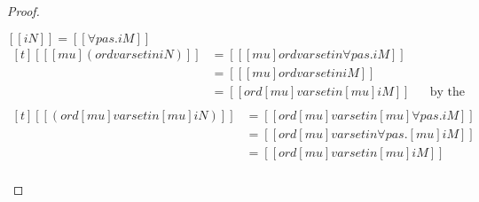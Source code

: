 \begin{proof}
\begin{caseof}
   \item $[[iN]] = [[∀ pas.iM]]$ \\
     $\begin{aligned}[t]
          [[ [mu] (ord varset in iN) ]] &= [[ [mu] ord varset in ∀pas.iM]] \\
                                        &= [[ [mu] ord varset in iM]] \\
                                        &= [[ ord [mu] varset in [mu] iM]]
                                        && \text {by the induction hypothesis}\\
     \end{aligned}$ \\
     $ 
     \begin{aligned}[t]
       [[ (ord [mu] varset in [mu] iN) ]] &= [[ ord [mu] varset in [mu] ∀pas.iM ]] \\
                                          &= [[ ord [mu] varset in ∀pas.[mu]iM ]] \\
                                          &= [[ ord [mu] varset in [mu] iM ]] \\
     \end{aligned}
     $
     
  \end{caseof}
\end{proof}


